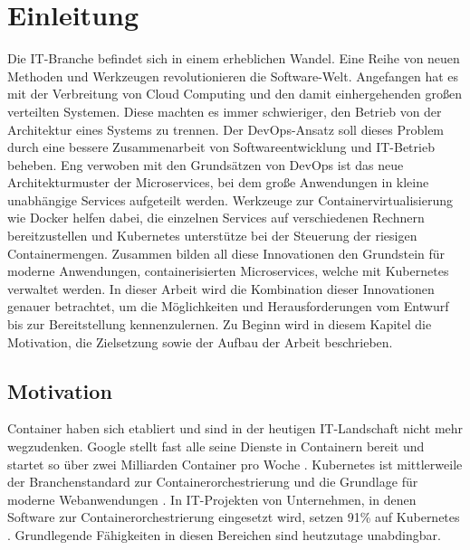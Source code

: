 \section{Einleitung}

\vspace{1em} 

Die IT-Branche befindet sich in einem erheblichen Wandel. Eine Reihe von neuen Methoden und Werkzeugen revolutionieren die Software-Welt. Angefangen hat es mit der Verbreitung von Cloud Computing und den damit einhergehenden großen verteilten Systemen. Diese machten es immer schwieriger, den Betrieb von der Architektur eines Systems zu trennen. Der DevOps-Ansatz soll dieses Problem durch eine bessere Zusammenarbeit von Softwareentwicklung und IT-Betrieb beheben. Eng verwoben mit den Grundsätzen von DevOps ist das neue Architekturmuster der Microservices, bei dem große Anwendungen in kleine unabhängige Services aufgeteilt werden. Werkzeuge zur Containervirtualisierung wie Docker helfen dabei, die einzelnen Services auf verschiedenen Rechnern bereitzustellen und Kubernetes unterstütze bei der Steuerung der riesigen Containermengen. Zusammen bilden all diese Innovationen den Grundstein für moderne Anwendungen, containerisierten Microservices, welche mit Kubernetes verwaltet werden. In dieser Arbeit wird die Kombination dieser Innovationen genauer betrachtet, um die Möglichkeiten und Herausforderungen vom Entwurf bis zur Bereitstellung kennenzulernen. Zu Beginn wird in diesem Kapitel die Motivation, die Zielsetzung sowie der Aufbau der Arbeit beschrieben.

\subsection{Motivation}

Container haben sich etabliert und sind in der heutigen IT-Landschaft nicht mehr wegzudenken. Google stellt fast alle seine Dienste in Containern bereit und startet so über zwei Milliarden Container pro Woche \parencite[vgl.][S. 43]{liebelSkalierbare2021}. Kubernetes ist mittlerweile der Branchenstandard zur Containerorchestrierung und die Grundlage für moderne Webanwendungen \parencite[vgl.][Vorwort]{arundelCloud2019}. In IT-Projekten von Unternehmen, in denen Software zur Containerorchestrierung eingesetzt wird, setzen 91\% auf Kubernetes \parencite[vgl.][S. 8]{cloudnativecomputingfoundationCloud2020}. Grundlegende Fähigkeiten in diesen Bereichen sind heutzutage unabdingbar.

